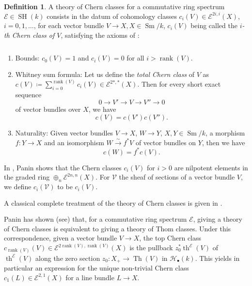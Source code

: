 \documentclass[10pt]{amsart}
\theoremstyle{definition}
\newtheorem{defn}{Definition}[section]
\theoremstyle{plain}
\numberwithin{equation}{section}
\newcommand{\0}{\emptyset}
\newcommand{\sE}{{\mathcal E}}
\newcommand{\sH}{{\mathcal H}}
\newcommand{\sV}{{\mathcal V}}
\newcommand{\SH}{{\operatorname{SH}}}
\newcommand{\Th}{{\operatorname{Th}}}
\newcommand{\Sm}{{\operatorname{Sm}}}
\renewcommand{\th}{{\operatorname{th}}}
\newcommand{\rnk}{{\operatorname{rank}}}
\begin{document}
\begin{defn}
\label{def:ChernClassTheory}
    A theory of Chern classes for a commutative ring spectrum $\sE \in \SH(k)$ consists in the datum of cohomology classes $c_i(V) \in \sE^{2i,i}(X)$, $i=0,1,\ldots$, for each vector bundle $V \to X, X \in \Sm/k$, $c_i(V)$ being called the \emph{$i$-th Chern class of $V$}, satisfying the axioms of \cite[Definition 3.26]{Pan:oriented}:

\begin{equation}\label{enum:ChernClassAxioms}
\end{equation}
\begin{enumerate} 
\item Bounds: $c_0(V)=1$ and $c_i(V)=0$ for all $i > \rnk(V)$.
\item Whitney sum formula: Let us define the \emph{total Chern class} of $V$ as $c(V) \coloneqq \sum_{i=0}^{\rnk(V)}c_i(V) \in \sE^{2*,*}(X)$. Then for every short exact sequence
$$0 \to V' \to V \to V'' \to 0$$
of vector bundles over $X$, we have
$$c(V)=c(V')c(V'').$$
\item Naturality: Given vector bundles $V\to X$, $W\to Y$, $X,Y\in \Sm/k$, a morphism $f:Y\to X$ and an isomorphism $W\xrightarrow{\sim} f^*V$ of vector bundles on $Y$, then we have
$$c(W)=f^*c(V).$$ 
\end{enumerate}
\end{defn}

In \cite[Theorem 3.27]{Pan:oriented}, Panin shows that the Chern classes $c_i(V)$ for $i>0$ are  nilpotent elements in the graded ring $\oplus_n\sE^{2n,n}(X)$. For $\sV$ the sheaf of sections of a vector bundle $V$, we define $c_i(\sV)$ to be $c_i(V)$.

A classical complete treatment of the theory of Chern classes is given in \cite{Gro:Chernclasses}.

Panin has shown (see\cite[Lemma 3.33, Theorems 3.5,  3.27,  3.36]{Pan:oriented}) that, for a commutative ring spectrum $\sE$, giving a theory of Chern classes is equivalent to giving a theory of Thom classes. Under this correspondence, given a vector bundle $V\to X$, the top Chern class $c_{\rnk(V)}(V)\in\sE^{2{\rnk(V)}, {\rnk(V)}}(X)$ is the pullback $z_0^*\th^\sE(V)$ of $\th^\sE(V)$ along the zero section $z_0:X_+ \to \Th(V)$ in $\sH_\bullet(k)$. This yields in particular an expression for the unique non-trivial Chern class $c_1(L)\in \sE^{2, 1}(X)$ for a line bundle $L\to X$.
\end{document}
